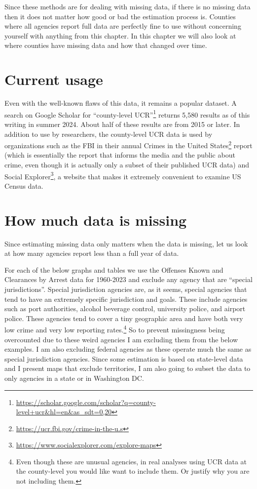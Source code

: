 \documentclass[
]{krantz}
\renewcommand{\href}[2]{#2\footnote{\url{#1}}}
\begin{document}
Since these methods are for dealing with missing data, if
there is no missing data then it does not matter how good or
bad the estimation process is. Counties where all agencies
report full data are perfectly fine to use without
concerning yourself with anything from this chapter. In this
chapter we will also look at where counties have missing
data and how that changed over time.

\section{Current usage}\label{current-usage}

Even with the well-known flaws of this data, it remains a
popular dataset. A search on Google Scholar for
\href{https://scholar.google.com/scholar?q=county-level+ucr&hl=en&as_sdt=0,20}{``county-level
UCR''} returns 5,580 results as of this writing in summer
2024. About half of these results are from 2015 or later. In
addition to use by researchers, the county-level UCR data is
used by organizations such as the FBI in their annual
\href{https://ucr.fbi.gov/crime-in-the-u.s}{Crimes in the
United States} report (which is essentially the report that
informs the media and the public about crime, even though it
is actually only a subset of their published UCR data) and
\href{https://www.socialexplorer.com/explore-maps}{Social
Explorer}, a website that makes it extremely convenient to
examine US Census data.

\section{How much data is
missing}\label{how-much-data-is-missing}

Since estimating missing data only matters when the data is
missing, let us look at how many agencies report less than a
full year of data.

For each of the below graphs and tables we use the Offenses
Known and Clearances by Arrest data for 1960-2023 and
exclude any agency that are ``special jurisdictions''.
Special jurisdiction agencies are, as it seems, special
agencies that tend to have an extremely specific
jurisdiction and goals. These include agencies such as port
authorities, alcohol beverage control, university police,
and airport police. These agencies tend to cover a tiny
geographic area and have both very low crime and very low
reporting rates.\footnote{Even though these are unusual
  agencies, in real analyses using UCR data at the
  county-level you would like want to include them. Or
  justify why you are not including them.} So to prevent
missingness being overcounted due to these weird agencies I
am excluding them from the below examples. I am also
excluding federal agencies as these operate much the same as
special jurisdiction agencies. Since some estimation is
based on state-level data and I present maps that exclude
territories, I am also going to subset the data to only
agencies in a state or in Washington DC.
\end{document}
